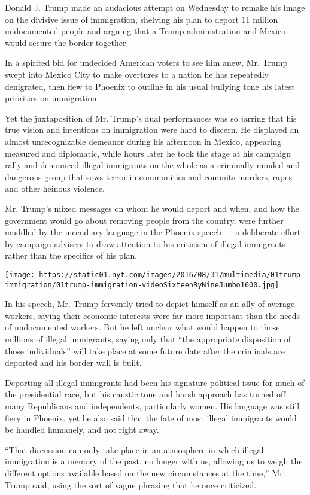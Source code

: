 Donald J. Trump made an audacious attempt on Wednesday to remake his
image on the divisive issue of immigration, shelving his plan to deport
11 million undocumented people and arguing that a Trump administration
and Mexico would secure the border together.

In a spirited bid for undecided American voters to see him anew, Mr.
Trump swept into Mexico City to make overtures to a nation he has
repeatedly denigrated, then flew to Phoenix to outline in his usual
bullying tone his latest priorities on immigration.

Yet the juxtaposition of Mr. Trump's dual performances was so jarring
that his true vision and intentions on immigration were hard to discern.
He displayed an almost unrecognizable demeanor during his afternoon in
Mexico, appearing measured and diplomatic, while hours later he took the
stage at his campaign rally and denounced illegal immigrants on the
whole as a criminally minded and dangerous group that sows terror in
communities and commits murders, rapes and other heinous violence.

Mr. Trump's mixed messages on whom he would deport and when, and how the
government would go about removing people from the country, were further
muddled by the incendiary language in the Phoenix speech --- a
deliberate effort by campaign advisers to draw attention to his
criticism of illegal immigrants rather than the specifics of his plan.

\texttt{[image: https://static01.nyt.com/images/2016/08/31/multimedia/01trump-immigration/01trump-immigration-videoSixteenByNineJumbo1600.jpg]}

In his speech, Mr. Trump fervently tried to depict himself as an ally of
average workers, saying their economic interests were far more important
than the needs of undocumented workers. But he left unclear what would
happen to those millions of illegal immigrants, saying only that ``the
appropriate disposition of those individuals'' will take place at some
future date after the criminals are deported and his border wall is
built.

Deporting all illegal immigrants had been his signature political issue
for much of the presidential race, but his caustic tone and harsh
approach has turned off many Republicans and independents, particularly
women. His language was still fiery in Phoenix, yet he also said that
the fate of most illegal immigrants would be handled humanely, and not
right away.

``That discussion can only take place in an atmosphere in which illegal
immigration is a memory of the past, no longer with us, allowing us to
weigh the different options available based on the new circumstances at
the time,'' Mr. Trump said, using the sort of vague phrasing that he
once criticized.


